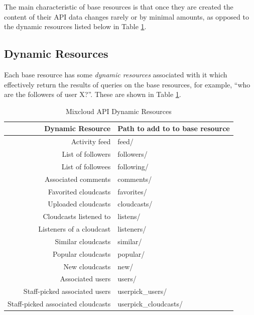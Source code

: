 \documentclass[a4paper,12pt,twoside,notitlepage]{report}
\newcommand{\todo}[1]{\ifdraft{\textsf{\color{red} TODO: #1}}\fi}
\begin{document}
The main characteristic of base resources is that once they are created the
content of their API data changes rarely or by minimal amounts, as opposed to
the dynamic resources listed below in Table \ref{tab:dyn-resources}.



\subsection{Dynamic Resources}
Each base resource has some \emph{dynamic resources} associated with
it which effectively return the results of queries on the base resources, for
example, ``who are the followers of user X?''. These are shown in Table
\ref{tab:dyn-resources}.

\begin{table}[h]
  \begin{center}
  \begin{tabular}{r >{\ttfamily}l<{\normalfont}}
Dynamic Resource 	& \textnormal{Path to add to to base resource} \\
\hline
Activity feed 	& feed/ \\
List of followers & followers/ \\
List of followees & following/ \\
Associated comments & comments/ \\
Favorited cloudcasts & favorites/ \\
Uploaded cloudcasts & cloudcasts/ \\
Cloudcasts listened to & listens/ \\
Listeners of a cloudcast & listeners/ \\
Similar cloudcasts & similar/ \\
Popular cloudcasts & popular/ \\
New cloudcasts & new/ \\
Associated users & users/ \\
Staff-picked associated users & userpick\_users/ \\
Staff-picked associated cloudcasts & userpick\_cloudcasts/ \\
  \end{tabular}
   
  \end{center}
\caption{Mixcloud API Dynamic Resources}
\label{tab:dyn-resources}
\end{table}
\end{document}
